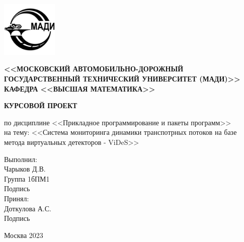 \begin{titlepage}
\begin{center}
\includegraphics[width=0.2\textwidth]{images/university_logo.jpg}
\end{center}


\begin{center}
\noindent\begin{minipage}{0.14\textwidth}
\end{minipage}%
\begin{minipage}{0.86\textwidth}
\center{\small{\vspace{\baselineskip}}}
\end{minipage}
\small{\textbf{<<МОСКОВСКИЙ АВТОМОБИЛЬНО-ДОРОЖНЫЙ ГОСУДАРСТВЕННЫЙ ТЕХНИЧЕСКИЙ УНИВЕРСИТЕТ (МАДИ)>>}}\\
\vspace{1cm}
\scriptsize{{\textbf{КАФЕДРА <<ВЫСШАЯ МАТЕМАТИКА>> }}}
\vspace{1cm}
\vspace{\baselineskip}
    
\small{\textbf{КУРСОВОЙ ПРОЕКТ}}\\
\vspace{0.2 cm}

по дисциплине <<Прикладное программирование и пакеты программ>>\\
на тему: 
<<Система мониторинга динамики транспотрных потоков на базе метода виртуальных детекторов - ViDeS>>
\end{center}
\vfill
\begin{flushright}
    
Выполнил:\\
Чарыков Д.В.\\
Группа 1бПМ1\\
Подпись\\
\vspace{1cm}
Принял:\\
Доткулова А.С.\\
\vspace{1cm}
Подпись
\end{flushright}


\vspace{1cm}
\begin{center}
Москва 2023
\end{center}
\end{titlepage}